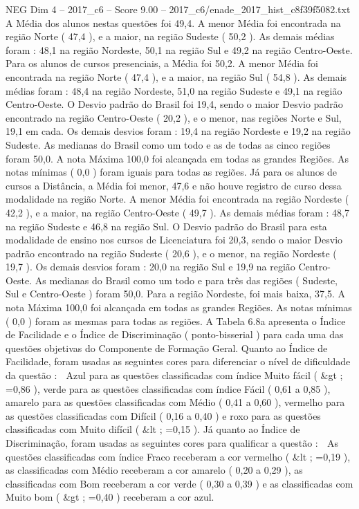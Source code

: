 \begin{textsample}{NEG Dim 4 – 2017\_c6 – Score 9.00 – 2017\_c6/enade\_2017\_hist\_c8f39f5082.txt}
A Média dos alunos nestas questões foi 49,4.
A menor Média foi encontrada na região Norte ( 47,4 ), e a maior, na região Sudeste ( 50,2 ).
As demais médias foram : 48,1 na região Nordeste, 50,1 na região Sul e 49,2 na região Centro-Oeste.
Para os alunos de cursos presenciais, a Média foi 50,2.
A menor Média foi encontrada na região Norte ( 47,4 ), e a maior, na região Sul ( 54,8 ).
As demais médias foram : 48,4 na região Nordeste, 51,0 na região Sudeste e 49,1 na região Centro-Oeste.
O Desvio padrão do Brasil foi 19,4, sendo o maior Desvio padrão encontrado na região Centro-Oeste ( 20,2 ), e o menor, nas regiões Norte e Sul, 19,1 em cada.
Os demais desvios foram : 19,4 na região Nordeste e 19,2 na região Sudeste.
As medianas do Brasil como um todo e as de todas as cinco regiões foram 50,0.
A nota Máxima 100,0 foi alcançada em todas as grandes Regiões.
As notas mínimas ( 0,0 ) foram iguais para todas as regiões.
Já para os alunos de cursos a Distância, a Média foi menor, 47,6 e não houve registro de curso dessa modalidade na região Norte.
A menor Média foi encontrada na região Nordeste ( 42,2 ), e a maior, na região Centro-Oeste ( 49,7 ).
As demais médias foram : 48,7 na região Sudeste e 46,8 na região Sul.
O Desvio padrão do Brasil para esta modalidade de ensino nos cursos de Licenciatura foi 20,3, sendo o maior Desvio padrão encontrado na região Sudeste ( 20,6 ), e o menor, na região Nordeste ( 19,7 ).
Os demais desvios foram : 20,0 na região Sul e 19,9 na região Centro-Oeste.
As medianas do Brasil como um todo e para três das regiões ( Sudeste, Sul e Centro-Oeste ) foram 50,0.
Para a região Nordeste, foi mais baixa, 37,5.
A nota Máxima 100,0 foi alcançada em todas as grandes Regiões.
As notas mínimas ( 0,0 ) foram as mesmas para todas as regiões.
A Tabela 6.8a apresenta o Índice de Facilidade e o Índice de Discriminação ( ponto-bisserial ) para cada uma das questões objetivas do Componente de Formação Geral.
Quanto ao Índice de Facilidade, foram usadas as seguintes cores para diferenciar o nível de dificuldade da questão :  Azul para as questões classificadas com índice Muito fácil ( \&gt ; =0,86 ), verde para as questões classificadas com índice Fácil ( 0,61 a 0,85 ), amarelo para as questões classificadas com Médio ( 0,41 a 0,60 ), vermelho para as questões classificadas com Difícil ( 0,16 a 0,40 ) e roxo para as questões classificadas com Muito difícil ( \&lt ; =0,15 ).
Já quanto ao Índice de Discriminação, foram usadas as seguintes cores para qualificar a questão :  As questões classificadas com índice Fraco receberam a cor vermelho ( \&lt ; =0,19 ), as classificadas com Médio receberam a cor amarelo ( 0,20 a 0,29 ), as classificadas com Bom receberam a cor verde ( 0,30 a 0,39 ) e as classificadas com Muito bom ( \&gt ; =0,40 ) receberam a cor azul.

\end{textsample}
